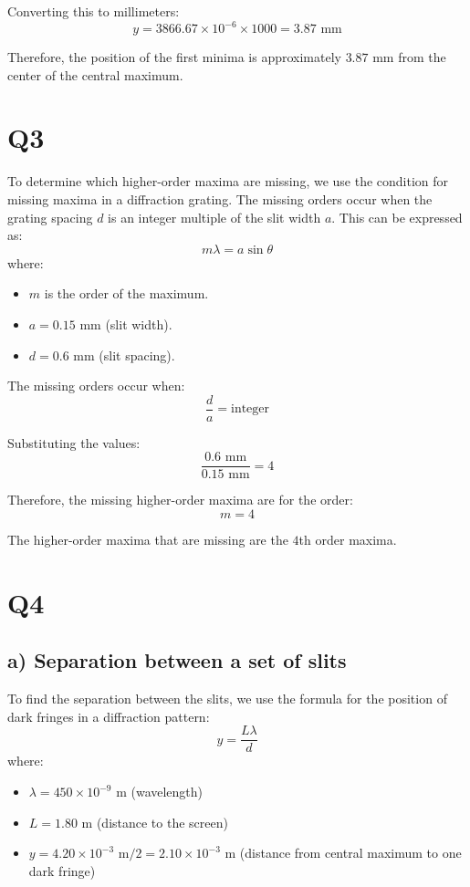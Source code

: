 \documentclass{article}
\begin{document}
Converting this to millimeters:
\[
y = 3866.67 \times 10^{-6} \times 1000 = 3.87 \text{ mm}
\]

Therefore, the position of the first minima is approximately \(3.87 \text{ mm}\) from the center of the central maximum.


\section{Q3}
To determine which higher-order maxima are missing, we use the condition for missing maxima in a diffraction grating. The missing orders occur when the grating spacing \(d\) is an integer multiple of the slit width \(a\). This can be expressed as:
\[
m \lambda = a \sin \theta
\]
where:
\begin{itemize}
    \item \(m\) is the order of the maximum.
    \item \(a = 0.15 \text{ mm}\) (slit width).
    \item \(d = 0.6 \text{ mm}\) (slit spacing).
\end{itemize}

The missing orders occur when:
\[
\frac{d}{a} = \text{integer}
\]

Substituting the values:
\[
\frac{0.6 \text{ mm}}{0.15 \text{ mm}} = 4
\]

Therefore, the missing higher-order maxima are for the order:
\[
m = 4
\]

The higher-order maxima that are missing are the \(4\)th order maxima.

\section{Q4}
\subsection*{a) Separation between a set of slits}
To find the separation between the slits, we use the formula for the position of dark fringes in a diffraction pattern:
\[
y = \frac{L \lambda}{d}
\]
where:
\begin{itemize}
    \item \( \lambda = 450 \times 10^{-9} \text{ m} \) (wavelength)
    \item \( L = 1.80 \text{ m} \) (distance to the screen)
    \item \( y = 4.20 \times 10^{-3} \text{ m} / 2 = 2.10 \times 10^{-3} \text{ m} \) (distance from central maximum to one dark fringe)
\end{itemize}
\end{document}
